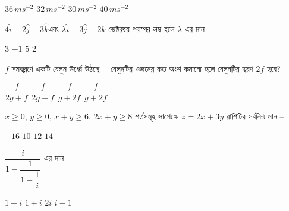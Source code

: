 \documentclass[addpoints]{exam}
\begin{document}
\begin{questions}
\begin{oneparchoices}
\choice $ 36\,ms^{-2}$
\choice $ 32\,ms^{-2}$
\choice $ 30\,ms^{-2}$
\choice $ 40\,ms^{-2}$
\end{oneparchoices}

\question $ 4\hat{i}+2\hat{j}-3\hat{k} $এবং $ \lambda\hat{i}-3\hat{j}+2\hat{k} $ ভেক্টরদ্বয় পরস্পর লম্ব হলে $ \lambda $ এর মান

\begin{oneparchoices}
\choice $ 3 $
\choice $ -1 $
\choice $ 5 $
\choice $ 2 $
\end{oneparchoices}


\question $ f $ সমত্বরণে একটি বেলুন উর্ধ্বে উঠছে । বেলুনটির ওজনের কত অংশ কমানো হলে বেলুনটির ত্বরণ $ 2f $ হবে? 
 
\begin{oneparchoices}
\choice $ \dfrac{f}{2g+f} $
\choice $ \dfrac{f}{2g-f} $
\choice $ \dfrac{f}{g+2f} $
\choice $ \dfrac{f}{g+2f} $
\end{oneparchoices}

\question  $ x\ge 0,\, y\ge 0,\, x+y \ge 6,\, 2x+y\ge 8 $ শর্তসমূহ সাপেক্ষে $ z=2x+3y $ রাশিটির সর্বনিন্ম মান – 

\begin{oneparchoices}
\choice $ -16 $
\choice  $ 10 $
\choice $ 12 $
\choice $ 14 $
\end{oneparchoices}


\question $ \dfrac{i}{1-\dfrac{1}{1-\dfrac{1}{i}}} $ এর মান - 

 
\begin{oneparchoices}
\choice $ 1-i $
\choice $ 1+i $
\choice $ 2i $
\choice $ i-1 $
\end{oneparchoices}

\end{questions}
\end{document}
